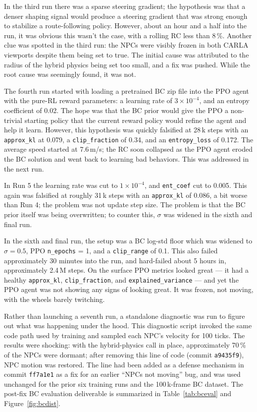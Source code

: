 \documentclass[conference]{IEEEtran}
\begin{document}
In the third run there was a sparse steering gradient; the
hypothesis was that a denser shaping signal would produce
a steering gradient that was strong enough to stabilize a
route-following policy. However, about an hour and a half
into the run, it was obvious this wasn't the case, with a
rolling RC less than 8\,\%. Another clue was spotted in
the third run: the NPCs were visibly frozen in both CARLA
viewports despite them being set to true. The initial
cause was attributed to the radius of the hybrid physics
being set too small, and a fix was pushed. While the root
cause was seemingly found, it was not.

The fourth run started with loading a pretrained BC zip
file into the PPO agent with the pure-RL reward
parameters: a learning rate of $3 \times 10^{-4}$, and an
entropy coefficient of 0.02. The hope was that the BC
prior would give the PPO a non-trivial starting policy
that the current reward policy would refine the agent and
help it learn. However, this hypothesis was quickly
falsified at 28\,k steps with an \texttt{approx\_kl} at
0.079, a \texttt{clip\_fraction} of 0.34, and an
\texttt{entropy\_loss} of 0.172. The average speed started
at 7.6\,m/s; the RC soon collapsed as the PPO agent eroded
the BC solution and went back to learning bad behaviors.
This was addressed in the next run.

In Run 5 the learning rate was cut to $1 \times 10^{-4}$,
and \texttt{ent\_coef} cut to 0.005. This again was
falsified at roughly 31\,k steps with an
\texttt{approx\_kl} of 0.086, a bit worse than Run 4; the
problem was not update step size. The problem is that the
BC prior itself was being overwritten; to counter this,
$\sigma$ was widened in the sixth and final run.

In the sixth and final run, the setup was a BC log-std
floor which was widened to $\sigma = 0.5$, PPO
\texttt{n\_epochs} = 1, and a \texttt{clip\_range} of 0.1.
This also failed approximately 30 minutes into the run,
and hard-failed about 5 hours in, approximately 2.4\,M
steps. On the surface PPO metrics looked great --- it had
a healthy \texttt{approx\_kl}, \texttt{clip\_fraction},
and \texttt{explained\_variance} --- and yet the PPO
agent was not showing any signs of looking great. It was
frozen, not moving, with the wheels barely twitching.

Rather than launching a seventh run, a standalone
diagnostic was run to figure out what was happening under
the hood. This diagnostic script invoked the same code
path used by training and sampled each NPC's velocity for
100 ticks. The results were shocking: with the
hybrid-physics call in place, approximately 70\,\% of the
NPCs were dormant; after removing this line of code (commit
\texttt{a9435f9}), NPC motion was restored. The line had
been added as a defense mechanism in commit
\texttt{ff7a1e1} as a fix for an earlier ``NPCs not
moving'' bug, and was used unchanged for the prior six
training runs and the 100\,k-frame BC dataset.
The post-fix BC evaluation deliverable is summarized in
Table~\ref{tab:bceval} and Figure~\ref{fig:bcdist}.
\end{document}
